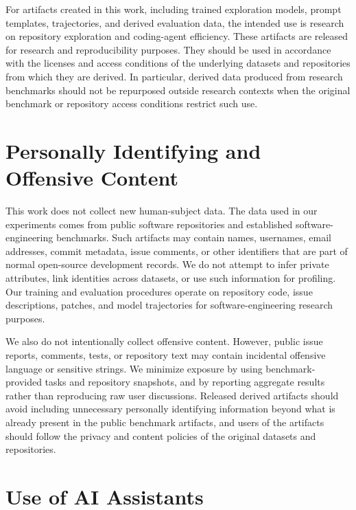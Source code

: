 \documentclass{llmxive}
\begin{document}
For artifacts created in this work, including trained exploration models, prompt templates, trajectories, and derived evaluation data, the intended use is research on repository exploration and coding-agent efficiency. These artifacts are released for research and reproducibility purposes. They should be used in accordance with the licenses and access conditions of the underlying datasets and repositories from which they are derived. In particular, derived data produced from research benchmarks should not be repurposed outside research contexts when the original benchmark or repository access conditions restrict such use.

\section{Personally Identifying and Offensive Content}

This work does not collect new human-subject data. The data used in our experiments comes from public software repositories and established software-engineering benchmarks. Such artifacts may contain names, usernames, email addresses, commit metadata, issue comments, or other identifiers that are part of normal open-source development records. We do not attempt to infer private attributes, link identities across datasets, or use such information for profiling. Our training and evaluation procedures operate on repository code, issue descriptions, patches, and model trajectories for software-engineering research purposes.

We also do not intentionally collect offensive content. However, public issue reports, comments, tests, or repository text may contain incidental offensive language or sensitive strings. We minimize exposure by using benchmark-provided tasks and repository snapshots, and by reporting aggregate results rather than reproducing raw user discussions. Released derived artifacts should avoid including unnecessary personally identifying information beyond what is already present in the public benchmark artifacts, and users of the artifacts should follow the privacy and content policies of the original datasets and repositories.

\section{Use of AI Assistants}
\end{document}
